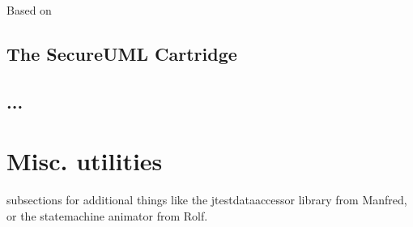 \documentclass[bibtotoc,liststotoc]{scrbook}
\begin{document}
Based on \cite{stock:automatic:2007}

\subsection{The SecureUML Cartridge}

\subsection{...}
 
\section{Misc. utilities}

 subsections for additional things like the jtestdataaccessor
  library from Manfred, or the statemachine animator from Rolf.



\end{document}
